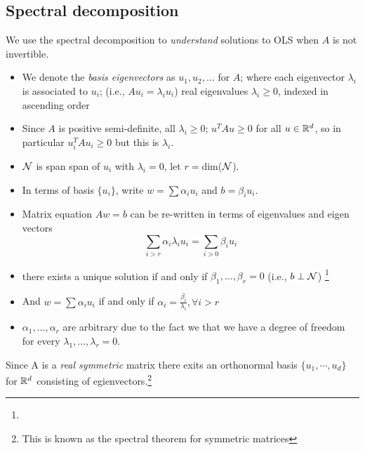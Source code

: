 \subsection{Spectral decomposition}
We use the spectral decomposition to \textit{understand} solutions to OLS when $A$ is not invertible. 
\begin{itemize}
    \item We denote the \textit{basis eigenvectors} as $u_1, u_2, \dots$ for $A$; where each eigenvector $\lambda_i$ is associated to $u_i$; (i.e., $Au_i = \lambda_i u_i$)
    real eigenvalues $\lambda_i \geq 0$, indexed in ascending order
    \item Since $A$ is positive semi-definite, all $\lambda_i \geq 0$; $u^TAu \geq 0$ for all $u \in \mathbb R^d$, so in particular $u_i^T A u_i \geq 0$ but this is $\lambda_i$. 
    \item $\mathcal N$ is span span of $u_i$ with $\lambda_i = 0$, let $r =$dim($\mathcal N$).
    \item In terms of basis $\{u_i\}$, write $w = \sum \alpha_i u_i$ and $b = \beta_i u_i$.
    \item Matrix equation $Aw = b$ can be re-written in terms of eigenvalues and eigen vectors
        $$
        \sum_{i > r} \alpha_i \lambda_i u_i = \sum_{i > 0} \beta_i u_i 
        $$
    \item there exists a unique solution if and only if $\beta_1, \dots, \beta_r = 0$ 
    (i.e., $b \perp \mathcal N$) \footnote{}

    \item And $w = \sum \alpha_i u_i$ if and only if $\alpha_i = \frac{\beta_i}{\lambda_i}, \forall i > r$
    
    \item $\alpha_1, \dots, \alpha_r$ are arbitrary due to the fact we that we have a degree of freedom for every $\lambda_1, \dots, \lambda_r = 0$.
\end{itemize}

Since A is a \textit{real symmetric} matrix there exits an orthonormal basis $\{u_1, \cdots, u_d\}$ for $\mathbb R^d$ consisting of egienvectors.\footnote{This is known as the spectral theorem for symmetric matrices}

 